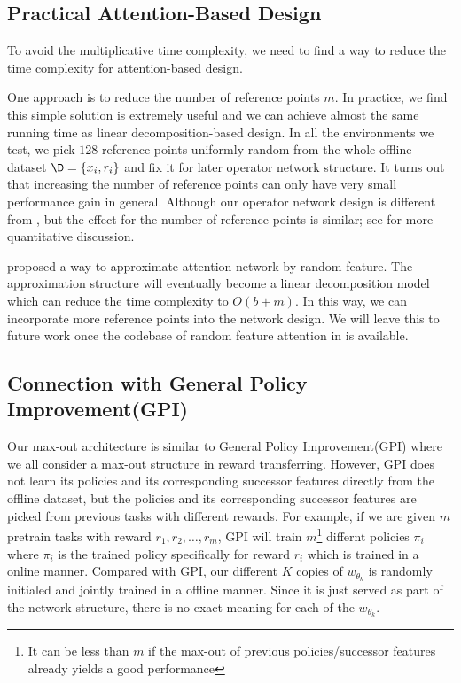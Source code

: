 \subsection{Practical Attention-Based Design}
To avoid the multiplicative time complexity, we need to find a way to reduce the time complexity for attention-based design.

One approach is to reduce the number of reference points $m$.
In practice, we find this simple solution is extremely useful and we can achieve almost the same running time as linear decomposition-based design.
In all the environments we test, we pick $128$ reference points uniformly random from the whole offline dataset $\D = \{x_i, r_i\}$ and fix it for later operator network structure.
It turns out that increasing the number of reference points can only have very small performance gain in general.
Although our operator network design is different from \cite{lu2019deeponet}, but the effect for the number of reference points is similar; see \citet{lu2019deeponet} for more quantitative discussion.

\citet{peng2021random} proposed a way to approximate attention network by random feature. 
The approximation structure will eventually become a linear decomposition model which can reduce the time complexity to $O(b+m)$.
In this way, we can incorporate more reference points into the network design.
We will leave this to future work once the codebase of random feature attention in \citet{peng2021random} is available.

\subsection{Connection with General Policy Improvement(GPI)}
Our max-out architecture is similar to General Policy Improvement(GPI) \citep{barreto2018transfer} where we all consider a max-out structure in reward transferring.
However,
GPI does not learn its policies and its corresponding successor features directly from the offline dataset, but the policies and its corresponding successor features are picked from previous tasks with different rewards.
For example, if we are given $m$ pretrain tasks with reward $r_1, r_2,\ldots, r_m$, GPI will train $m$\footnote{It can be less than $m$ if the max-out of previous policies/successor features already yields a good performance} differnt policies $\pi_i$ where $\pi_i$ is the trained policy specifically for reward $r_i$ which is trained in a online manner.
Compared with GPI, our different $K$ copies of $w_{\theta_k}$ is randomly initialed and jointly trained in a offline manner. Since it is just served as part of the network structure, there is no exact meaning for each of the $w_{\theta_k}$.

